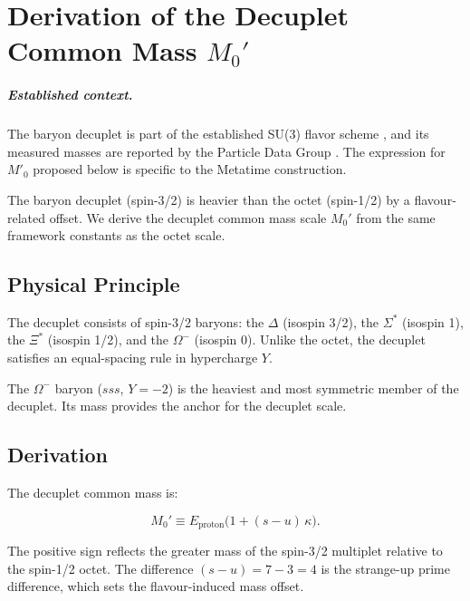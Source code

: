 \chapter{Derivation of the Decuplet Common Mass \(M_0'\)}
\label{ch:decuplet_m0prime}


\paragraph{Established context.}
The baryon decuplet is part of the established SU(3) flavor scheme
\cite{gellmann1961,GellMann1962,Neeman1961}, and its measured masses are reported
by the Particle Data Group \cite{PDG2024}.  The expression for $M'_0$ proposed
below is specific to the Metatime construction.

The baryon decuplet (spin-3/2) is heavier than the octet (spin-1/2) by a
flavour-related offset.  We derive the decuplet common mass scale \(M_0'\)
from the same framework constants as the octet scale.

\section{Physical Principle}

The decuplet consists of spin-3/2 baryons: the \(\Delta\) (isospin 3/2),
the \(\Sigma^*\) (isospin 1), the \(\Xi^*\) (isospin 1/2), and the
\(\Omega^-\) (isospin 0).  Unlike the octet, the decuplet satisfies an
equal-spacing rule in hypercharge \(Y\).

The \(\Omega^-\) baryon (\(sss\), \(Y=-2\)) is the heaviest and most
symmetric member of the decuplet.  Its mass provides the anchor for the
decuplet scale.

\section{Derivation}

The decuplet common mass is:

\begin{equation}
M_0' \equiv E_{\text{proton}}\bigl(1 + (s-u)\,\kappa\bigr).
\label{eq:M0prime}
\end{equation}

The positive sign reflects the greater mass of the spin-3/2 multiplet
relative to the spin-1/2 octet.  The difference \((s-u) = 7-3 = 4\) is
the strange-up prime difference, which sets the flavour-induced mass
offset.

